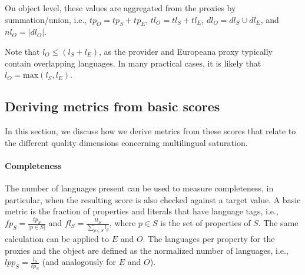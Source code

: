 
On object level, these values are aggregated from the proxies by summation/union, i.e., $tp_O = tp_S + tp_E$, $tl_O = tl_S + tl_E$, $dl_O = dl_S \cup dl_E$, and $nl_O = |dl_O|$.


\noindent Note that $l_O \leq (l_S + l_E)$, as the provider and Europeana proxy typically contain overlapping languages. In many practical cases, it is likely that $l_O = \mathrm{max}(l_S, l_E)$.

\subsection{Deriving metrics from basic scores}
In this section, we discuss how we derive metrics from these scores that relate to the different quality dimensions concerning multilingual saturation.

\paragraph{Completeness} The number of languages present can be used to measure completeness, in particular, when the resulting score is also checked against a target value. A basic metric is the fraction of properties and literals that have language tags, i.e., $fp_S = \frac{tp_S}{|p \in S| }$ and $fl_S = \frac{tl_S}{\sum_{p \in S} l_p}$,
%
%
where $p \in S$ is the set of properties of $S$. The same calculation can be applied to $E$ and $O$. The languages per property for the proxies and the object are defined as the normalized number of languages, i.e., $lpp_S = \frac{l_S}{tp_S}$ (and analogously for $E$ and $O$).

